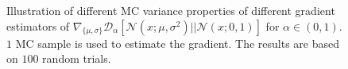 \documentclass[letterpaper]{article} %
\newcommand{\Nc}[0]{\ensuremath{\mathcal{N}} }
\newcommand{\Dc}[0]{\ensuremath{\mathcal{D}} }
\begin{document}
\begin{figure}[tb]
	\centering
	\caption{Illustration of different MC variance properties of different gradient estimators of $\nabla_{\{\mu,\sigma\}}\Dc_{\alpha}[\Nc(x;\mu,\sigma^2)||\Nc(x;0,1)]$ for $\alpha \in (0,1)$.
		$1$ MC sample is used to estimate the gradient. The results are based on $100$ random trials. } \label{fig:alpha_grad_var}
\end{figure}
\end{document}
